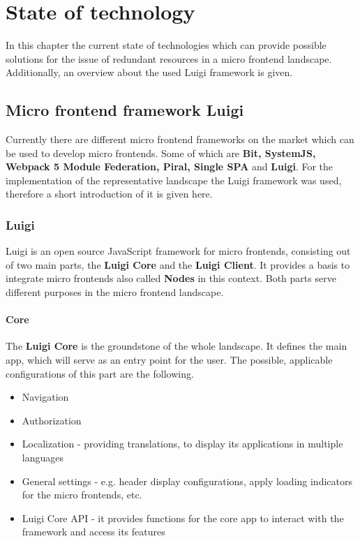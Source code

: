 \chapter{State of technology} %
\label{Chapter2}


In this chapter the current state of technologies which can provide possible solutions for the issue of redundant resources in a micro frontend landscape. Additionally, an overview about the used Luigi framework is given.

\section{Micro frontend framework Luigi}
\label{mf_framework_luigi}

Currently there are different micro frontend frameworks on the market which can be used to develop micro frontends. Some of which are \textbf{Bit, SystemJS, Webpack 5 Module Federation, Piral, Single SPA} and \textbf{Luigi}.\cite{top10_mffs}
For the implementation of the representative landscape the Luigi framework was used, therefore a short introduction of it is given here.

\subsection{Luigi}

Luigi is an open source JavaScript framework for micro frontends, consisting out of two main parts, the \textbf{Luigi Core} and the \textbf{Luigi Client}. It provides a basis to integrate micro frontends also called \textbf{Nodes} in this context. Both parts serve different purposes in the micro frontend landscape.\cite{luigi_doc_overview}

\subsubsection{Core}

The \textbf{Luigi Core} is the groundstone of the whole landscape. It defines the main app, which will serve as an entry point for the user. The possible, applicable configurations of this part are the following.

\begin{itemize}[noitemsep]
	\item Navigation
	\item Authorization
	\item Localization - providing translations, to display its applications in multiple languages
	\item General settings - e.g. header display configurations, apply loading indicators for the micro frontends, etc.
	\item Luigi Core API - it provides functions for the core app to interact with the framework and access its features
\end{itemize} 

